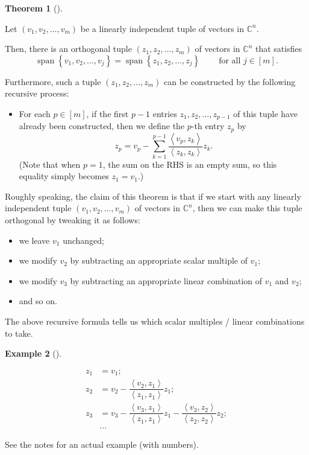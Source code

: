 \documentclass[numbers=enddot,12pt,final,onecolumn,notitlepage]{scrartcl}%
\numberwithin{exer}{subsection}
\theoremstyle{definition}
\newtheorem{theo}{Theorem}[subsection]
\newenvironment{theorem}[1][]
{\begin{theo}[#1]\begin{leftbar}}
{\end{leftbar}\end{theo}}
\newtheorem{exam}[theo]{Example}
\newenvironment{example}[1][]
{\begin{exam}[#1]\begin{leftbar}}
{\end{leftbar}\end{exam}}
\let\sumnonlimits\sum
\renewcommand{\sum}{\sumnonlimits\limits}
\begin{document}
\begin{theorem}
[Gram--Schmidt process]Let $\left(  v_{1},v_{2},\ldots,v_{m}\right)  $ be a
linearly independent tuple of vectors in $\mathbb{C}^{n}$.

Then, there is an orthogonal tuple $\left(  z_{1},z_{2},\ldots,z_{m}\right)  $
of vectors in $\mathbb{C}^{n}$ that satisfies%
\[
\operatorname*{span}\left\{  v_{1},v_{2},\ldots,v_{j}\right\}
=\operatorname*{span}\left\{  z_{1},z_{2},\ldots,z_{j}\right\}
\ \ \ \ \ \ \ \ \ \ \text{for all }j\in\left[  m\right]  .
\]


Furthermore, such a tuple $\left(  z_{1},z_{2},\ldots,z_{m}\right)  $ can be
constructed by the following recursive process:

\begin{itemize}
\item For each $p\in\left[  m\right]  $, if the first $p-1$ entries
$z_{1},z_{2},\ldots,z_{p-1}$ of this tuple have already been constructed, then
we define the $p$-th entry $z_{p}$ by%
\[
z_{p}=v_{p}-\sum_{k=1}^{p-1}\dfrac{\left\langle v_{p},z_{k}\right\rangle
}{\left\langle z_{k},z_{k}\right\rangle }z_{k}.
\]
(Note that when $p=1$, the sum on the RHS is an empty sum, so this equality
simply becomes $z_{1}=v_{1}$.)
\end{itemize}
\end{theorem}

Roughly speaking, the claim of this theorem is that if we start with any
linearly independent tuple $\left(  v_{1},v_{2},\ldots,v_{m}\right)  $ of
vectors in $\mathbb{C}^{n}$, then we can make this tuple orthogonal by
tweaking it as follows:

\begin{itemize}
\item we leave $v_{1}$ unchanged;

\item we modify $v_{2}$ by subtracting an appropriate scalar multiple of
$v_{1}$;

\item we modify $v_{3}$ by subtracting an appropriate linear combination of
$v_{1}$ and $v_{2}$;

\item and so on.
\end{itemize}

The above recursive formula tells us which scalar multiples / linear
combinations to take.

\begin{example}%
\begin{align*}
z_{1}  &  =v_{1};\\
z_{2}  &  =v_{2}-\dfrac{\left\langle v_{2},z_{1}\right\rangle }{\left\langle
z_{1},z_{1}\right\rangle }z_{1};\\
z_{3}  &  =v_{3}-\dfrac{\left\langle v_{3},z_{1}\right\rangle }{\left\langle
z_{1},z_{1}\right\rangle }z_{1}-\dfrac{\left\langle v_{3},z_{2}\right\rangle
}{\left\langle z_{2},z_{2}\right\rangle }z_{2};\\
&  \ldots
\end{align*}


See the notes for an actual example (with numbers).
\end{example}
\end{document}
